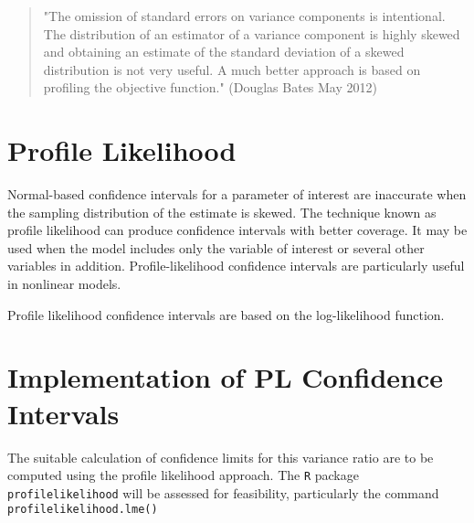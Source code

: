 \documentclass[12pt, a4paper]{report}
\begin{document}
\begin{quote}
	"The omission of standard errors on variance components is intentional.
	The distribution of an estimator of a variance component is highly
	skewed and obtaining an estimate of the standard deviation of a skewed
	distribution is not very useful.  A much better approach is based on
	profiling the objective function." (Douglas Bates May 2012)
\end{quote}


\section{Profile Likelihood}
Normal-based confidence intervals for a parameter of interest are inaccurate when the sampling distribution of the estimate is skewed. The technique known as profile likelihood can produce confidence intervals with better coverage. It may be used when the model includes only the variable of interest or several other variables in addition. Profile-likelihood confidence intervals are particularly useful in nonlinear models.

Profile likelihood confidence intervals are based on the log-likelihood function.  


\section{Implementation of PL Confidence Intervals}

The suitable calculation of confidence limits for this variance ratio are to be computed using the profile likelihood approach. The \texttt{R} package \texttt{profilelikelihood} will be assessed for feasibility, particularly the command \texttt{profilelikelihood.lme()}




\end{document}
